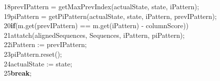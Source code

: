 \documentclass[a4paper,10pt]{thesis}
\begin{document}
{{{{        18\hspace*{2em}\hspace*{2em}\hspace*{2em}\hspace*{2em}prevIPattern = getMaxPrevIndex(actualState, state, iPattern);\\
        19\hspace*{2em}\hspace*{2em}\hspace*{2em}\hspace*{2em}piPattern = getPiPattern(actualState, state, iPattern, prevIPattern);\\
        20\hspace*{2em}\hspace*{2em}\hspace*{2em}\hspace*{2em}\textbf{if}(m.get(prevIPattern) == m.get(iPattern) - columnScore))\\
        21\hspace*{2em}\hspace*{2em}\hspace*{2em}\hspace*{2em}\hspace*{2em}attatch(alignedSequences, Sequences, iPattern, piPattern);\\
        22\hspace*{2em}\hspace*{2em}\hspace*{2em}\hspace*{2em}\hspace*{2em}iPattern := prevIPattern;\\
        23\hspace*{2em}\hspace*{2em}\hspace*{2em}\hspace*{2em}\hspace*{2em}piPattern.reset();\\
        24\hspace*{2em}\hspace*{2em}\hspace*{2em}\hspace*{2em}\hspace*{2em}actualState := state;\\
        25\hspace*{2em}\hspace*{2em}\hspace*{2em}\hspace*{2em}\hspace*{2em}\textbf{break};\\\\
}}}}
\end{document}
